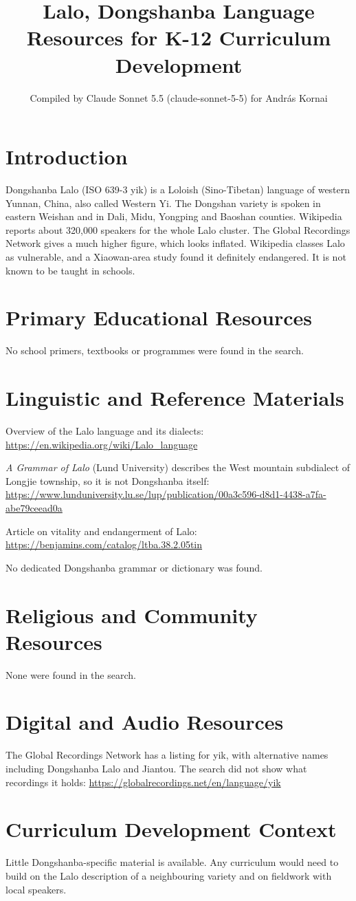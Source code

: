 \documentclass[12pt]{article}
\title{Lalo, Dongshanba Language Resources for K-12 Curriculum Development}
\author{Compiled by Claude Sonnet 5.5 (claude-sonnet-5-5) for Andr\'as Kornai}
\date{}
\begin{document}
\maketitle
\section{Introduction}
Dongshanba Lalo (ISO 639-3 yik) is a Loloish (Sino-Tibetan) language of western Yunnan, China, also called Western Yi. The Dongshan variety is spoken in eastern Weishan and in Dali, Midu, Yongping and Baoshan counties. Wikipedia reports about 320,000 speakers for the whole Lalo cluster. The Global Recordings Network gives a much higher figure, which looks inflated. Wikipedia classes Lalo as vulnerable, and a Xiaowan-area study found it definitely endangered. It is not known to be taught in schools.
\section{Primary Educational Resources}
No school primers, textbooks or programmes were found in the search.
\section{Linguistic and Reference Materials}
Overview of the Lalo language and its dialects: \url{https://en.wikipedia.org/wiki/Lalo_language}

\emph{A Grammar of Lalo} (Lund University) describes the West mountain subdialect of Longjie township, so it is not Dongshanba itself: \url{https://www.lunduniversity.lu.se/lup/publication/00a3c596-d8d1-4438-a7fa-abe79ceead0a}

Article on vitality and endangerment of Lalo: \url{https://benjamins.com/catalog/ltba.38.2.05tin}

No dedicated Dongshanba grammar or dictionary was found.
\section{Religious and Community Resources}
None were found in the search.
\section{Digital and Audio Resources}
The Global Recordings Network has a listing for yik, with alternative names including Dongshanba Lalo and Jiantou. The search did not show what recordings it holds: \url{https://globalrecordings.net/en/language/yik}
\section{Curriculum Development Context}
Little Dongshanba-specific material is available. Any curriculum would need to build on the Lalo description of a neighbouring variety and on fieldwork with local speakers.
\end{document}
